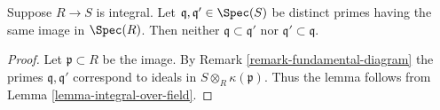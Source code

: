 \begin{lemma}
\label{lemma-integral-no-inclusion}
Suppose $R \to S$ is integral.
Let $\mathfrak q, \mathfrak q' \in \Spec(S)$
be distinct primes
having the same image in $\Spec(R)$.
Then neither $\mathfrak q \subset \mathfrak q'$
nor $\mathfrak q' \subset \mathfrak q$.
\end{lemma}

\begin{proof}
Let $\mathfrak p \subset R$ be the image.
By Remark \ref{remark-fundamental-diagram}
the primes $\mathfrak q, \mathfrak q'$
correspond to ideals in
$S \otimes_R \kappa(\mathfrak p)$.
Thus the lemma follows from Lemma \ref{lemma-integral-over-field}.
\end{proof}